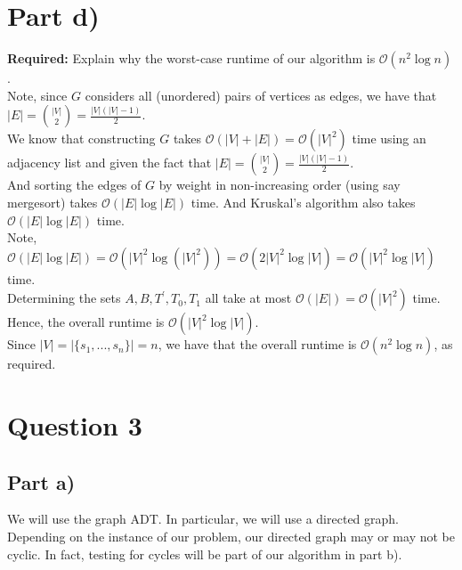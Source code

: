 \documentclass[12pt]{article}
\begin{document}
\section*{Part d)}

\textbf{Required:} Explain why the worst-case runtime of our algorithm is $\mathcal{O}(n^2 \log n)$. \\

Note, since $G$ considers all (unordered) pairs of vertices as edges, we have that $|E| = \binom{|V|}{2} = \frac{|V|(|V|-1)}{2}$. \\

We know that constructing $G$ takes $\mathcal{O}(|V| + |E|) = \mathcal{O}(|V|^2)$ time using an adjacency list and given the fact that $|E| = \binom{|V|}{2} = \frac{|V|(|V|-1)}{2}$. \\

And sorting the edges of $G$ by weight in non-increasing order (using say mergesort) takes $\mathcal{O}(|E| \log|E|)$ time. And Kruskal's algorithm also takes $\mathcal{O}(|E| \log|E|)$ time. \\

Note, $\mathcal{O}(|E| \log|E|) = \mathcal{O}(|V|^2\log(|V|^2)) = \mathcal{O}(2|V|^2\log|V|) = \mathcal{O}(|V|^2\log|V|)$ time. \\

Determining the sets $A,B,T^\prime,T_0,T_1$ all take at most $\mathcal{O}(|E|) = \mathcal{O}(|V|^2)$ time. \\

Hence, the overall runtime is $\mathcal{O}(|V|^2\log|V|)$. \\

Since $|V| = |\{s_1,...,s_n\}| = n$, we have that the overall runtime is $\mathcal{O}(n^2 \log n)$, as required. 

\newpage

\section*{Question 3}

\subsection*{Part a)}

We will use the graph ADT. In particular, we will use a directed graph. Depending on the instance of our problem, our directed graph may or may not be cyclic. In fact, testing for cycles will be part of our algorithm in part b). \\
\end{document}
